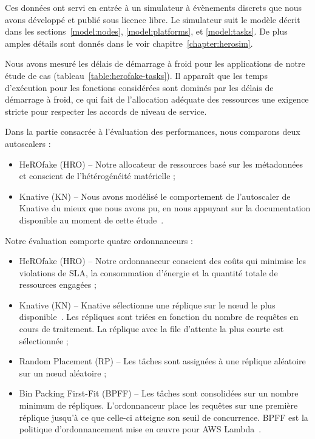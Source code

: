 Ces données ont servi en entrée à un simulateur à évènements discrets que nous avons développé et publié sous licence libre. Le simulateur suit le modèle décrit dans les sections~\ref{model:nodes}, \ref{model:platforms}, et \ref{model:tasks}. De plus amples détails sont donnés dans le voir chapitre~\ref{chapter:herosim}.

Nous avons mesuré les délais de démarrage à froid pour les applications de notre étude de cas (tableau~\ref{table:herofake-tasks}). Il apparaît que les temps d'exécution pour les fonctions considérées sont dominés par les délais de démarrage à froid, ce qui fait de l'allocation adéquate des ressources une exigence stricte pour respecter les accords de niveau de service.

Dans la partie consacrée à l'évaluation des performances, nous comparons deux autoscalers :

\begin{itemize}
    \item HeROfake (HRO) -- Notre allocateur de ressources basé sur les métadonnées et conscient de l'hétérogénéité matérielle ;
    \item Knative (KN) -- Nous avons modélisé le comportement de l'autoscaler de Knative du mieux que nous avons pu, en nous appuyant sur la documentation disponible au moment de cette étude~\cite{knative-autoscaling}.
\end{itemize}

Notre évaluation comporte quatre ordonnanceurs :

\begin{itemize}
    \item HeROfake (HRO) -- Notre ordonnanceur conscient des coûts qui minimise les violations de SLA, la consommation d'énergie et la quantité totale de ressources engagées ;
    \item Knative (KN) -- Knative sélectionne une réplique sur le nœud le plus disponible~\cite{sureshENSUREEfficientScheduling2020}. Les répliques sont triées en fonction du nombre de requêtes en cours de traitement. La réplique avec la file d'attente la plus courte est sélectionnée ;
    \item Random Placement (RP) -- Les tâches sont assignées à une réplique aléatoire sur un nœud aléatoire ;
    \item Bin Packing First-Fit (BPFF) -- Les tâches sont consolidées sur un nombre minimum de répliques. L'ordonnanceur place les requêtes sur une première réplique jusqu'à ce que celle-ci atteigne son seuil de concurrence. BPFF est la politique d'ordonnancement mise en œuvre pour AWS Lambda~\cite{wangPeekingCurtainsServerlessb}.
\end{itemize}

